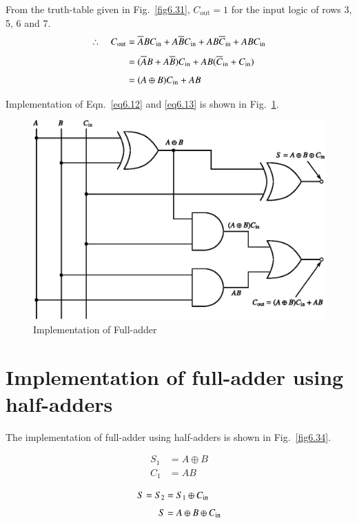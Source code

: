 From the truth-table given in Fig.~\ref{fig6.31}, $C_{\text{out}} = 1$ for the
input logic of rows 3, 5, 6 and 7.
\begin{align}
\therefore\quad C_{\text{out}} &=
\overline{A}BC_{\text{in}}+A\overline{B}C_{\text{in}}+AB\overline{C}_{\text{in}}+ABC_{\text{in}}\notag\\[4pt]
&=
(\overline{A}B+A\overline{B})C_{\text{in}}+AB(\overline{C}_{\text{in}}+C_{\text{in}})\notag\\[4pt]
&= (A\oplus B)C_{\text{in}}+AB\label{eq6.13}
\end{align}

\eject

Implementation of Eqn.~\eqref{eq6.12} and \eqref{eq6.13} is shown in Fig.~\ref{fig6.33}.
\begin{figure}[H]
\centering
\includegraphics{chap6/fig130_6.33.eps}
\caption{Implementation of Full-adder}\label{fig6.33}
\end{figure}

\section{Implementation of full-adder using half-adders}

The implementation of full-adder using half-adders is shown in Fig.~\ref{fig6.34}.
\medskip

\begin{align*}
S_{1} &= A\oplus B\\[3pt]
C_{1} &= AB
\end{align*}

\begin{align}
S=S_{2} &= S_{1}\oplus C_{\text{in}}\notag\\[3pt]
S &= A\oplus B\oplus C_{\text{in}}\label{eq6.14}
\end{align}

